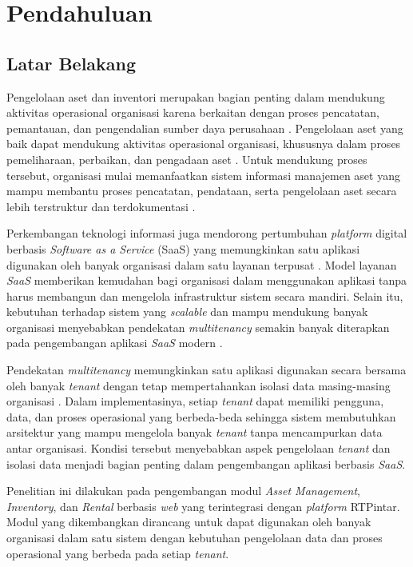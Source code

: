 \chapter{Pendahuluan}

\section{Latar Belakang}

Pengelolaan aset dan inventori merupakan bagian penting dalam mendukung aktivitas operasional organisasi karena berkaitan dengan proses pencatatan, pemantauan, dan pengendalian sumber daya perusahaan \cite{ref3}. Pengelolaan aset yang baik dapat mendukung aktivitas operasional organisasi, khususnya dalam proses pemeliharaan, perbaikan, dan pengadaan aset \cite{ref4}. Untuk mendukung proses tersebut, organisasi mulai memanfaatkan sistem informasi manajemen aset yang mampu membantu proses pencatatan, pendataan, serta pengelolaan aset secara lebih terstruktur dan terdokumentasi \cite{ref4}.

Perkembangan teknologi informasi juga mendorong pertumbuhan \textit{platform} digital berbasis
\textit{Software as a Service} (SaaS) yang memungkinkan satu aplikasi digunakan oleh banyak
organisasi dalam satu layanan terpusat \cite{ref3}. Model layanan \textit{SaaS} memberikan
kemudahan bagi organisasi dalam menggunakan aplikasi tanpa harus membangun dan mengelola
infrastruktur sistem secara mandiri. Selain itu, kebutuhan terhadap sistem yang \textit{scalable}
dan mampu mendukung banyak organisasi menyebabkan pendekatan \textit{multitenancy} semakin banyak
diterapkan pada pengembangan aplikasi \textit{SaaS} modern \cite{ref4}.

Pendekatan \textit{multitenancy} memungkinkan satu aplikasi digunakan secara bersama oleh banyak
\textit{tenant} dengan tetap mempertahankan isolasi data masing-masing organisasi
\cite{ref3,ref5}. Dalam implementasinya, setiap \textit{tenant} dapat memiliki pengguna, data,
dan proses operasional yang berbeda-beda sehingga sistem membutuhkan arsitektur yang mampu
mengelola banyak \textit{tenant} tanpa mencampurkan data antar organisasi. Kondisi tersebut
menyebabkan aspek pengelolaan \textit{tenant} dan isolasi data menjadi bagian penting dalam
pengembangan aplikasi berbasis \textit{SaaS}.

Penelitian ini dilakukan pada pengembangan modul \textit{Asset Management}, \textit{Inventory},
dan \textit{Rental} berbasis \textit{web} yang terintegrasi dengan \textit{platform} RTPintar.
Modul yang dikembangkan dirancang untuk dapat digunakan oleh banyak organisasi dalam satu sistem
dengan kebutuhan pengelolaan data dan proses operasional yang berbeda pada setiap \textit{tenant}.

